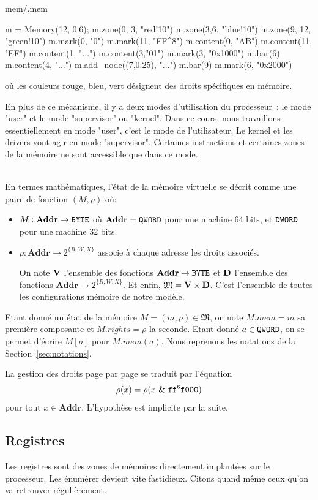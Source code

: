 \documentclass{book}
\newcounter{Qcours}
\newenvironment{memory}{%
	\noindent
	\VerbatimEnvironment\stepcounter{Qcours}%
	\begin{VerbatimOut}{mem/\theQcours.mem}%
	}{\end{VerbatimOut}%
}
\newenvironment{formalisme}[1]{%
	\def\FrameCommand{\fboxrule=\FrameRule\fboxsep=\FrameSep \fcolorbox{red!10}{red!5}}%
	\MakeFramed {\advance\hsize-\width \FrameRestore}
	\noindent {\bf #1}\\
}%
{\endMakeFramed}
\newcommand{\BYTE}{{\tt BYTE}}
\newcommand{\DWORD}{{\tt DWORD}}
\newcommand{\QWORD}{{\tt QWORD}}
\newcommand{\Memory}{{\mathfrak{M}}}
\newcommand{\Addr}{{\mathbf{Addr}}}
\begin{document}
\medskip
\begin{memory}
m = Memory(12, 0.6);
m.zone(0, 3, "red!10")
m.zone(3,6, "blue!10")
m.zone(9, 12, "green!10")
m.mark(0, "0")
m.mark(11, "FF\^ {}8")
m.content(0, "AB")
m.content(11, "EF")
m.content(1, "$\ldots$")
m.content(3,"01")
m.mark(3, "0x1000")
m.bar(6)
m.content(4, "$\ldots$")
m.add_node((7,0.25), "$\ldots$")
m.bar(9)
m.mark(6, "0x2000")
\end{memory}
où les couleurs rouge, bleu, vert désignent des droits spécifiques en mémoire. 

\medskip
En plus de ce mécanisme, il y a deux modes d'utilisation du processeur~: le mode "user" et le mode "supervisor" ou "kernel". Dans ce cours, nous travaillons essentiellement en mode "user", c'est le mode de l'utilisateur. Le kernel et les drivers vont agir en mode "supervisor". Certaines instructions et certaines zones de la mémoire ne sont accessible que dans ce mode. 

\begin{formalisme}{La mémoire virtuelle}
En termes mathématiques, l'état de la mémoire virtuelle se décrit comme une paire de fonction $(M,\rho)$ où:
\begin{itemize}
	\item $M : \Addr \to \BYTE$ où $\Addr = \QWORD$ pour une machine 64 bits, et $\DWORD$ pour une machine 32 bits.
	\item $\rho: \Addr \to 2^{\{R, W, X\}}$ associe à chaque adresse les droits associés.
	
On note $\bf{V}$ l'ensemble des fonctions $\Addr \to \BYTE$ et $\bf{D}$ l'ensemble des fonctions $\Addr \to 2^{\{R, W, X\}}$. Et enfin, $\Memory = \bf{V} \times \bf{D}$. C'est l'ensemble de toutes les configurations mémoire de notre modèle. 
\end{itemize}

Etant donné un état de la mémoire $M = (m,\rho) \in \Memory$, on note $M.mem = m$ sa première composante et $M.rights = \rho$ la seconde. Etant donné $a \in \QWORD$, on se permet d'écrire $M[a]$ pour $M.mem(a)$. Nous reprenons les notations de la Section~\ref{sec:notations}.

La gestion des droits page par page se traduit par l'équation $$\rho(x) = \rho(x \ \& \ \tt{ff^6f000}  )$$ pour tout $x\in \Addr$. L'hypothèse est implicite par la suite. 	
\end{formalisme}

\subsection{Registres}
Les registres sont des zones de mémoires directement implantées sur le processeur. Les énumérer devient vite fastidieux. Citons quand même ceux qu'on va retrouver régulièrement. 
\end{document}
